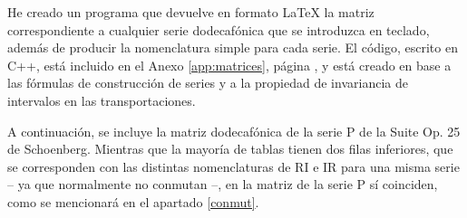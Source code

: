 		He creado un programa que devuelve en formato \LaTeX{} la matriz correspondiente a cualquier serie dodecafónica que se introduzca en teclado, además de producir la nomenclatura simple para cada serie. El código, escrito en C++, está incluido en el Anexo \ref{app:matrices}, página \pageref{app:matrices}, y está creado en base a las fórmulas de construcción de series y a la propiedad de invariancia de intervalos en las transportaciones.
		
		A continuación, se incluye la matriz dodecafónica de la serie P de la Suite Op. 25 de Schoenberg. Mientras que la mayoría de tablas tienen dos filas inferiores, que se corresponden con las distintas nomenclaturas de RI e IR para una misma serie – ya que normalmente no conmutan –, en la matriz de la serie P sí coinciden, como se mencionará en el apartado \ref{conmut}.
		
	
